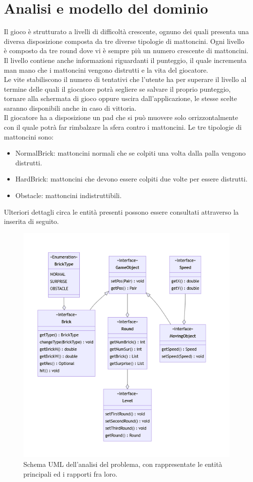 \documentclass[a4paper,12pt]{report}
\begin{document}
\section{Analisi e modello del dominio}
Il gioco è strutturato a livelli di difficoltà crescente, ognuno dei quali presenta una diversa disposizione composta da tre diverse tipologie di mattoncini. Ogni livello è composto da tre round dove vi è sempre più un numero crescente di mattoncini.
Il livello contiene anche informazioni riguardanti il punteggio, il quale incrementa man mano che i mattoncini vengono distrutti e la vita del giocatore.
\\Le vite stabiliscono il numero di tentativi che l'utente ha per superare il livello al termine delle quali il giocatore potrà segliere se salvare il proprio punteggio, tornare alla schermata di gioco oppure uscira dall'applicazione, le stesse scelte saranno disponibili anche in caso di vittoria.
\\Il giocatore ha a disposizione un pad che si può muovere solo orrizzontalmente con il quale potrà far rimbalzare la sfera contro i mattoncini.
Le tre tipologie di mattoncini sono:
\begin{itemize}
  \item NormalBrick: mattoncini normali che se colpiti una volta dalla palla vengono distrutti.
  \item HardBrick: mattoncini che devono essere colpiti due volte per essere distrutti.
  \item Obstacle: mattoncini indistruttibili.
\end{itemize}
Ulteriori dettagli circa le entità presenti possono essere consultati attraverso la  inserita di seguito.
\begin{figure}[H]
  \centering{}
  \includegraphics[scale=0.8]{images/analysis.png}
  \caption{Schema UML dell'analisi del problema, con rappresentate le entità principali ed i rapporti fra loro.}
  \label{images:analysis}
\end{figure}
\end{document}
